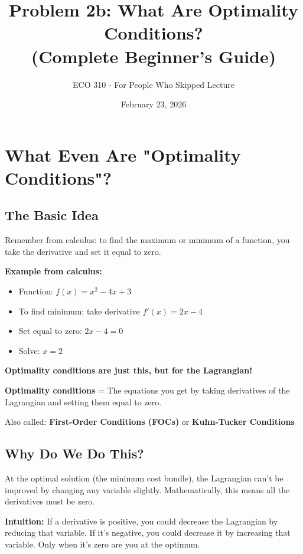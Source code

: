 \documentclass[11pt]{article}
\title{Problem 2b: What Are Optimality Conditions? \\ (Complete Beginner's Guide)}
\author{ECO 310 - For People Who Skipped Lecture}
\date{February 23, 2026}
\begin{document}
\maketitle

\section{What Even Are "Optimality Conditions"?}

\subsection{The Basic Idea}

Remember from calculus: to find the maximum or minimum of a function, you take the derivative and set it equal to zero.

\textbf{Example from calculus:}
\begin{itemize}
\item Function: $f(x) = x^2 - 4x + 3$
\item To find minimum: take derivative $f'(x) = 2x - 4$
\item Set equal to zero: $2x - 4 = 0$
\item Solve: $x = 2$
\end{itemize}

\textbf{Optimality conditions are just this, but for the Lagrangian!}

\begin{tcolorbox}[colback=blue!5!white,colframe=blue!75!black,title=Optimality Conditions Definition]
\textbf{Optimality conditions} = The equations you get by taking derivatives of the Lagrangian and setting them equal to zero.

Also called: \textbf{First-Order Conditions (FOCs)} or \textbf{Kuhn-Tucker Conditions}
\end{tcolorbox}

\subsection{Why Do We Do This?}

At the optimal solution (the minimum cost bundle), the Lagrangian can't be improved by changing any variable slightly. Mathematically, this means all the derivatives must be zero.

\textbf{Intuition:} If a derivative is positive, you could decrease the Lagrangian by reducing that variable. If it's negative, you could decrease it by increasing that variable. Only when it's zero are you at the optimum.
\end{document}
